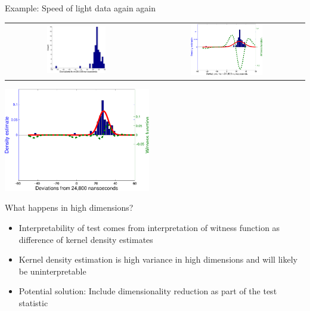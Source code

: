 \begin{frame}{Example: Speed of light data again again}
  \begin{center}
  \begin{tabular}{cc}
    \includegraphics[width=0.435\textwidth]{figures/newcomb_hist} &
    \pause
    \includegraphics[width=0.48\textwidth]{figures/newcomb_witness_1}
  \end{tabular}
  \end{center}
  \pause
  \begin{center}
    \includegraphics[width=0.48\textwidth]{figures/newcomb_witness_2}
  \end{center}
\end{frame}

\begin{frame}{What happens in high dimensions?}
  \begin{itemize}
    \item Interpretability of test comes from interpretation of witness function as difference of kernel density estimates
    \vspace{\baselineskip}
    \pause
    \item Kernel density estimation is high variance in high dimensions and will likely be uninterpretable
    \vspace{\baselineskip}
    \pause
    \item Potential solution: Include dimensionality reduction as part of the test statistic
  \end{itemize}
\end{frame}

